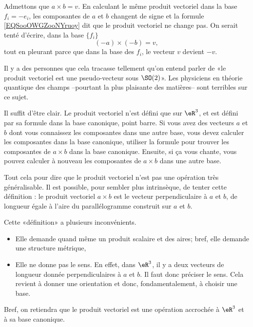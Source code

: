 \begin{normaltext}
    Admettons que \( a\times b=v\). En calculant le même produit vectoriel dans la base \( f_i=-e_i\), les composantes de \( a\) et \( b\) changent de signe et la formule \eqref{EQSooOWGZooNYruoy} dit que le produit vectoriel ne change pas. On serait tenté d'écrire, dans la base \( \{ f_i \}\)
    \begin{equation}
        (-a)\times (-b)=v,
    \end{equation}
    tout en pleurant parce que dans la base des \( f_i\), le vecteur \( v\) devient \( -v\).

    Il y a des personnes que cela tracasse tellement qu'on entend parler de «le produit vectoriel est une pseudo-vecteur sous \( \SO(2)\)». Les physiciens en théorie quantique des champs --pourtant la plus plaisante des matières-- sont terribles sur ce sujet.

    Il suffit d'être clair. Le produit vectoriel n'est défini que sur \( \eR^3\), et est défini par sa formule dans la base canonique, point barre. Si vous avez des vecteurs \( a\) et \( b\) dont vous connaissez les composantes dans une autre base, vous devez calculer les composantes dans la base canonique, utiliser la formule pour trouver les composantes de \( a\times b\) dans la base canonique. Ensuite, si ça vous chante, vous pouvez calculer à nouveau les composantes de \( a\times b\) dans une autre base.

    Tout cela pour dire que le produit vectoriel n'est pas une opération très généralisable. Il est possible, pour sembler plus intrinsèque, de tenter cette définition : le produit vectoriel \( a\times b\) est le vecteur perpendiculaire à \( a\) et \( b\), de longueur égale à l'aire du parallélogramme construit sur \( a\) et \( b\).

    Cette «définition» a plusieurs inconvénients.
    \begin{itemize}
        \item Elle demande quand même un produit scalaire et des aires; bref, elle demande une structure métrique,
        \item Elle ne donne pas le sens. En effet, dans \( \eR^3\), il y a deux vecteurs de longueur donnée perpendiculaires à \( a\) et \( b\). Il faut donc préciser le sens. Cela revient à donner une orientation et donc, fondamentalement, à choisir une base.
    \end{itemize}

    Bref, on retiendra que le produit vectoriel est une opération accrochée à \( \eR^3\) et à sa base canonique.
\end{normaltext}

